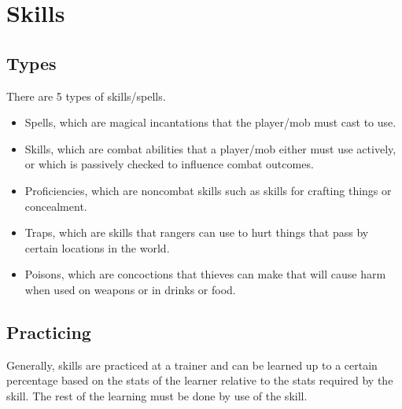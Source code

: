 \chapter{Skills}


\section{Types}

There are 5 types of skills/spells. 

\begin{itemize}


\item Spells, which are magical incantations that the player/mob must
cast to use.

\item Skills, which are combat abilities that a player/mob either must
use actively, or which is passively checked to influence combat
outcomes.

\item Proficiencies, which are noncombat skills such as skills for
crafting things or concealment.

\item Traps, which are skills that rangers can use to hurt things that
pass by certain locations in the world.

\item Poisons, which are concoctions that thieves can make that will
cause harm when used on weapons or in drinks or food.

\end{itemize}

\section{Practicing}

Generally, skills are practiced at a trainer and can be learned up to
a certain percentage based on the stats of the learner relative to the
stats required by the skill. The rest of the learning must be done by
use of the skill.